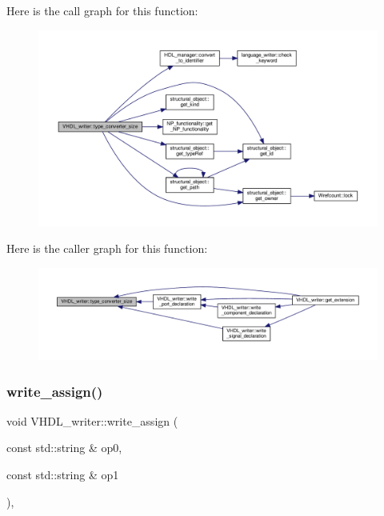 Here is the call graph for this function\+:
\nopagebreak
\begin{figure}[H]
\begin{center}
\leavevmode
\includegraphics[width=350pt]{d0/d0c/structVHDL__writer_aebe9a464e894d42bd3493c104d537e7f_cgraph}
\end{center}
\end{figure}
Here is the caller graph for this function\+:
\nopagebreak
\begin{figure}[H]
\begin{center}
\leavevmode
\includegraphics[width=350pt]{d0/d0c/structVHDL__writer_aebe9a464e894d42bd3493c104d537e7f_icgraph}
\end{center}
\end{figure}
\mbox{\label{structVHDL__writer_af48ed8414cfbd1a7713d3bab7b4b5218}} 
\subsubsection{\texorpdfstring{write\+\_\+assign()}{write\_assign()}}
{\footnotesize\ttfamily void V\+H\+D\+L\+\_\+writer\+::write\+\_\+assign (\begin{DoxyParamCaption}\item[{const std\+::string \&}]{op0,  }\item[{const std\+::string \&}]{op1 }\end{DoxyParamCaption})\hspace{0.3cm}{\ttfamily [override]}, {\ttfamily [virtual]}}



